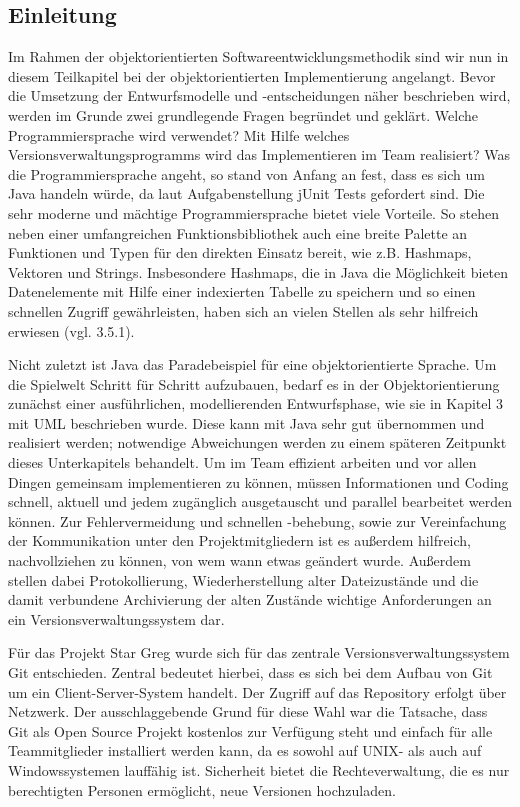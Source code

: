 \subsection{Einleitung}
\label{sub:fachkonzept-implementierung-einleitung}


Im Rahmen der objektorientierten Softwareentwicklungsmethodik sind wir nun in diesem Teilkapitel bei der objektorientierten Implementierung angelangt. Bevor die Umsetzung der Entwurfsmodelle und -entscheidungen näher beschrieben wird, werden im Grunde zwei grundlegende Fragen begründet und geklärt. Welche Programmiersprache wird verwendet? Mit Hilfe welches Versionsverwaltungsprogramms wird das Implementieren im Team realisiert?
Was die Programmiersprache angeht, so stand von Anfang an fest, dass es sich um Java handeln würde, da laut Aufgabenstellung jUnit Tests gefordert sind. Die sehr moderne und mächtige Programmiersprache bietet viele Vorteile. So stehen neben einer umfangreichen Funktionsbibliothek auch eine breite Palette an Funktionen und Typen für den direkten Einsatz bereit, wie z.B. Hashmaps, Vektoren und Strings. Insbesondere Hashmaps, die in Java die Möglichkeit bieten Datenelemente mit Hilfe einer indexierten Tabelle zu speichern und so einen schnellen Zugriff gewährleisten, haben sich an vielen Stellen als sehr hilfreich erwiesen (vgl. 3.5.1). 

Nicht zuletzt ist Java das Paradebeispiel für eine objektorientierte Sprache. Um die Spielwelt Schritt für Schritt aufzubauen, bedarf es in der Objektorientierung zunächst einer ausführlichen, modellierenden Entwurfsphase, wie sie in Kapitel 3 mit UML beschrieben wurde. Diese kann mit Java sehr gut übernommen und realisiert werden; notwendige Abweichungen werden zu einem späteren Zeitpunkt dieses Unterkapitels behandelt. 
Um im Team effizient arbeiten und vor allen Dingen gemeinsam implementieren zu können, müssen Informationen und Coding schnell, aktuell und jedem zugänglich ausgetauscht und parallel bearbeitet werden können. Zur Fehlervermeidung und schnellen -behebung, sowie zur Vereinfachung der Kommunikation unter den Projektmitgliedern ist es außerdem hilfreich, nachvollziehen zu können, von wem wann etwas geändert wurde. Außerdem stellen dabei Protokollierung, Wiederherstellung alter Dateizustände und die damit verbundene Archivierung der alten Zustände wichtige Anforderungen an ein Versionsverwaltungssystem dar. 

Für das Projekt Star Greg wurde sich für das zentrale Versionsverwaltungssystem Git entschieden. Zentral bedeutet hierbei, dass es sich bei dem Aufbau von Git um ein Client-Server-System handelt. Der Zugriff auf das Repository erfolgt über Netzwerk. Der ausschlaggebende Grund für diese Wahl war die Tatsache, dass Git als Open Source Projekt kostenlos zur Verfügung steht und einfach für alle Teammitglieder installiert werden kann, da es sowohl auf UNIX- als auch auf Windowssystemen lauffähig ist. Sicherheit bietet die Rechteverwaltung, die es nur berechtigten Personen ermöglicht, neue Versionen hochzuladen. 

